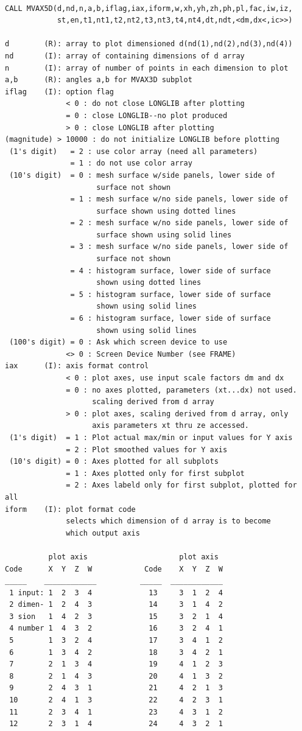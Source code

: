 \documentclass[11pt]{report}
\begin{document}
\begin{verbatim}

CALL MVAX5D(d,nd,n,a,b,iflag,iax,iform,w,xh,yh,zh,ph,pl,fac,iw,iz,
            st,en,t1,nt1,t2,nt2,t3,nt3,t4,nt4,dt,ndt,<dm,dx<,ic>>)

d        (R): array to plot dimensioned d(nd(1),nd(2),nd(3),nd(4))
nd       (I): array of containing dimensions of d array
n        (I): array of number of points in each dimension to plot
a,b      (R): angles a,b for MVAX3D subplot
iflag    (I): option flag
              < 0 : do not close LONGLIB after plotting
              = 0 : close LONGLIB--no plot produced
              > 0 : close LONGLIB after plotting
(magnitude) > 10000 : do not initialize LONGLIB before plotting
 (1's digit)   = 2 : use color array (need all parameters)
               = 1 : do not use color array
 (10's digit)  = 0 : mesh surface w/side panels, lower side of
                     surface not shown
               = 1 : mesh surface w/no side panels, lower side of
                     surface shown using dotted lines
               = 2 : mesh surface w/no side panels, lower side of
                     surface shown using solid lines
               = 3 : mesh surface w/no side panels, lower side of
                     surface not shown
               = 4 : histogram surface, lower side of surface
                     shown using dotted lines
               = 5 : histogram surface, lower side of surface
                     shown using solid lines
               = 6 : histogram surface, lower side of surface
                     shown using solid lines
 (100's digit) = 0 : Ask which screen device to use
              <> 0 : Screen Device Number (see FRAME)
iax      (I): axis format control
              < 0 : plot axes, use input scale factors dm and dx
              = 0 : no axes plotted, parameters (xt...dx) not used.
                    scaling derived from d array 
              > 0 : plot axes, scaling derived from d array, only
                    axis parameters xt thru ze accessed.
 (1's digit)  = 1 : Plot actual max/min or input values for Y axis
              = 2 : Plot smoothed values for Y axis
 (10's digit) = 0 : Axes plotted for all subplots
              = 1 : Axes plotted only for first subplot
              = 2 : Axes labeld only for first subplot, plotted for all
iform    (I): plot format code 
              selects which dimension of d array is to become
              which output axis 

          plot axis                     plot axis
Code      X  Y  Z  W            Code    X  Y  Z  W
_____    ____________          _____  ____________
 1 input: 1  2  3  4             13     3  1  2  4
 2 dimen- 1  2  4  3             14     3  1  4  2
 3 sion   1  4  2  3             15     3  2  1  4
 4 number 1  4  3  2             16     3  2  4  1
 5        1  3  2  4             17     3  4  1  2
 6        1  3  4  2             18     3  4  2  1
 7        2  1  3  4             19     4  1  2  3
 8        2  1  4  3             20     4  1  3  2
 9        2  4  3  1             21     4  2  1  3
 10       2  4  1  3             22     4  2  3  1
 11       2  3  4  1             23     4  3  1  2
 12       2  3  1  4             24     4  3  2  1


\end{verbatim}
\end{document}
